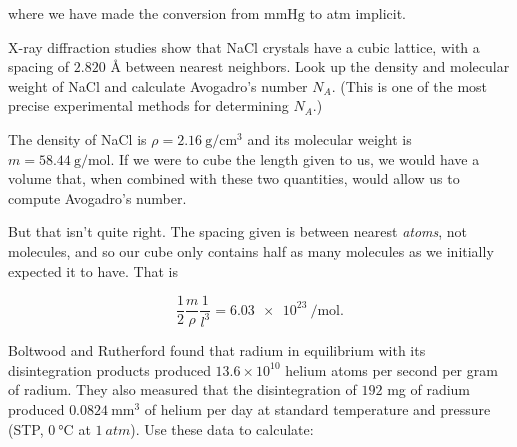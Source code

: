 \documentclass[../feynman-lectures-on-physics.tex]{subfiles}
\begin{document}
\begin{questions}
\begin{solution}
	where we have made the conversion from $\si{\mmHg}$ to atm implicit.
\end{solution}

\question X-ray diffraction studies show that NaCl crystals have a cubic lattice, with a spacing of $2.820$ $\si{\angstrom}$ between nearest neighbors. Look up the density and molecular weight of NaCl and calculate Avogadro's number $N_A$. (This is one of the most precise experimental methods for determining $N_A$.)

\begin{solution}
	The density of NaCl is $\rho = \SI{2.16}{\gram\per\centi\meter\cubed}$ and its molecular weight is $m = \SI{58.44}{\gram\per\mole}$. If we were to cube the length given to us, we would have a volume that, when combined with these two quantities, would allow us to compute Avogadro's number.

	But that isn't quite right. The spacing given is between nearest \textit{atoms}, not molecules, and so our cube only contains half as many molecules as we initially expected it to have. That is

	\[
	\frac{1}{2}\frac{m}{\rho}\frac{1}{l^3} = \SI{6.03e23}{\per\mole}
	.\] 
\end{solution}

\question Boltwood and Rutherford found that radium in equilibrium with its disintegration products produced $13.6\times{10^{10}}$ helium atoms per second per gram of radium. They also measured that the disintegration of $192$ mg of radium produced $\SI{0.0824}{\milli\meter\cubed}$ of helium per day at standard temperature and pressure (STP, $\SI{0}{\degreeCelsius}$ at $\SI{1}{atm}$). Use these data to calculate:

\begin{solution}
\end{solution}
\end{questions}
\end{document}
